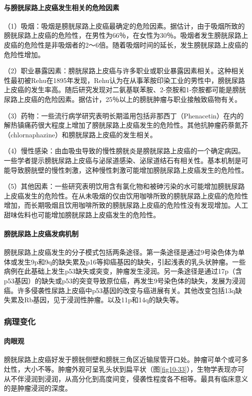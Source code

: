 \paragraph{与膀胱尿路上皮癌发生相关的危险因素}
（1）吸烟：吸烟是膀胱尿路上皮癌最确定的危险因素。据估计，由于吸烟所致的膀胱尿路上皮癌的危险性，在男性为66％，在女性为30％。吸烟者发生膀胱尿路上皮癌的危险性是非吸烟者的2～6倍。随着吸烟时间的延长，发生膀胱尿路上皮癌的危险性增加。

（2）职业暴露因素：膀胱尿路上皮癌与许多职业或职业暴露因素相关。这种相关性最初被Rehu在1895年发现，Rehu认为在从事苯胺印染工业的男性中，膀胱尿路上皮癌的发生率高。随后研究发现对二氨基联苯胺、2-奈胺和1-奈胺都可能是膀胱尿路上皮癌的危险因素。据估计，25％以上的膀胱肿瘤与职业接触致癌物有关。

（3）药物：一些流行病学研究表明长期滥用包括非那西丁（Phenacetin）在内的解热镇痛药很大程度上增加了膀胱尿路上皮癌发生的危险性。其他抗肿瘤药萘氮芥（chlornaphazine）和膀胱尿路上皮癌的发生相关。

（4）慢性感染：由血吸虫导致的慢性膀胱炎是膀胱尿路上皮癌的一个确定病因。一些学者提示膀胱尿路上皮癌与泌尿道感染、泌尿道结石有相关性。基本机制是可能导致膀胱壁的慢性刺激，这种慢性刺激可能增加膀胱尿路上皮癌发生的危险性。

（5）其他因素：一些研究表明饮用含有氯化物和被砷污染的水可能增加膀胱尿路上皮癌发生的危险性。在从未吸烟的仅由饮用咖啡所致的膀胱尿路上皮癌的危险性增加，而长期吸烟且饮用咖啡所致的膀胱尿路上皮癌的危险性没有发现增加。人工甜味佐料也可能增加膀胱尿路上皮癌发生的危险性。

\paragraph{膀胱尿路上皮癌发病机制}
膀胱尿路上皮癌发生的分子模式包括两条途径。第一条途径是通过9号染色体为单体或发生9p和9q的缺失累及p16等抑癌基因的缺失，引起浅表的乳头状肿瘤。一些病例在此基础上发生p53缺失或突变，肿瘤发生浸润。另一条途径是通过17p（含p53基因）的缺失或p53的突变导致原位癌，再发生9号染色体的缺失，发展为浸润癌。许多侵袭性尿路上皮癌中p53基因的改变与癌进展有关。其他改变包括13q缺失累及Rb基因，见于浸润性肿瘤。以及11p和14q的缺失等。

\subsubsection{病理变化}

\paragraph{肉眼观}
膀胱尿路上皮癌好发于膀胱侧壁和膀胱三角区近输尿管开口处。肿瘤可单个或可多灶性，大小不等。肿瘤外观可呈乳头状到扁平状（图\ref{fig10-33}），生物学表现亦可从不伴浸润到浸润，从高分化到高度间变，侵袭性程度各不相等。最具有临床意义的是肿瘤浸润的深度。

